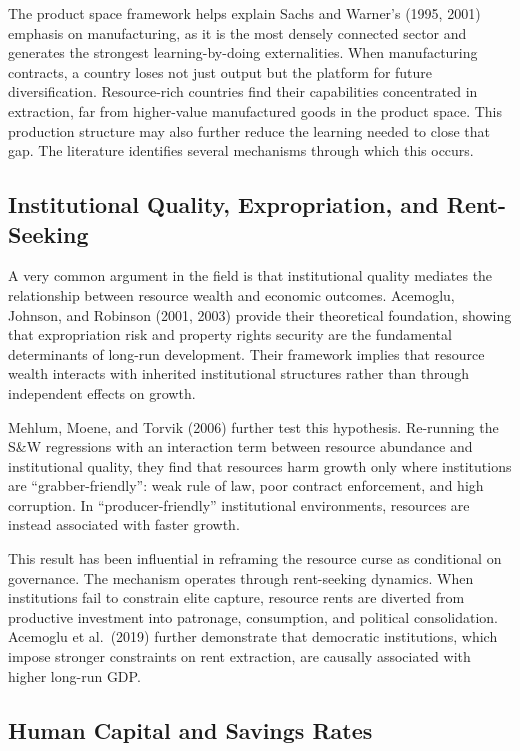 \documentclass[12pt,a4paper]{report}
\begin{document}
The product space framework helps explain Sachs and Warner's (1995, 2001) emphasis on manufacturing, as it is the most densely connected sector and generates the strongest learning-by-doing externalities. When manufacturing contracts, a country loses not just output but the platform for future diversification. Resource-rich countries find their capabilities concentrated in extraction, far from higher-value manufactured goods in the product space. This production structure may also further reduce the learning needed to close that gap. The literature identifies several mechanisms through which this occurs.

\subsection{Institutional Quality, Expropriation, and Rent-Seeking}

A very common argument in the field is that institutional quality mediates the relationship between resource wealth and economic outcomes. Acemoglu, Johnson, and Robinson (2001, 2003) provide their theoretical foundation, showing that expropriation risk and property rights security are the fundamental determinants of long-run development. Their framework implies that resource wealth interacts with inherited institutional structures rather than through independent effects on growth.

Mehlum, Moene, and Torvik (2006) further test this hypothesis. Re-running the S\&W regressions with an interaction term between resource abundance and institutional quality, they find that resources harm growth only where institutions are ``grabber-friendly'': weak rule of law, poor contract enforcement, and high corruption. In ``producer-friendly'' institutional environments, resources are instead associated with faster growth.

This result has been influential in reframing the resource curse as conditional on governance. The mechanism operates through rent-seeking dynamics. When institutions fail to constrain elite capture, resource rents are diverted from productive investment into patronage, consumption, and political consolidation. Acemoglu et al.\ (2019) further demonstrate that democratic institutions, which impose stronger constraints on rent extraction, are causally associated with higher long-run GDP.

\subsection{Human Capital and Savings Rates}
\end{document}

